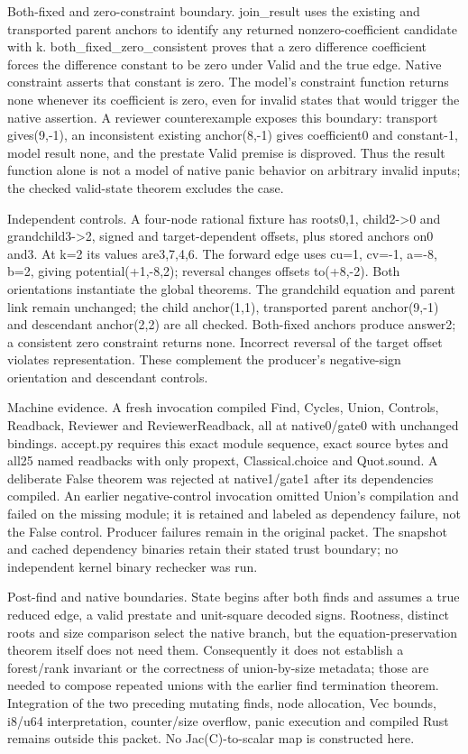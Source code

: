 \documentclass[10pt]{article}
\begin{document}
Both-fixed and zero-constraint boundary. join\_result uses the existing and transported parent anchors to identify any returned nonzero-coefficient candidate with k. both\_fixed\_zero\_consistent proves that a zero difference coefficient forces the difference constant to be zero under Valid and the true edge. Native constraint asserts that constant is zero. The model's constraint function returns none whenever its coefficient is zero, even for invalid states that would trigger the native assertion. A reviewer counterexample exposes this boundary: transport gives(9,-1), an inconsistent existing anchor(8,-1) gives coefficient0 and constant-1, model result none, and the prestate Valid premise is disproved. Thus the result function alone is not a model of native panic behavior on arbitrary invalid inputs; the checked valid-state theorem excludes the case.\par\medskip
Independent controls. A four-node rational fixture has roots0,1, child2->0 and grandchild3->2, signed and target-dependent offsets, plus stored anchors on0 and3. At k=2 its values are3,7,4,6. The forward edge uses cu=1, cv=-1, a=-8, b=2, giving potential(+1,-8,2); reversal changes offsets to(+8,-2). Both orientations instantiate the global theorems. The grandchild equation and parent link remain unchanged; the child anchor(1,1), transported parent anchor(9,-1) and descendant anchor(2,2) are all checked. Both-fixed anchors produce answer2; a consistent zero constraint returns none. Incorrect reversal of the target offset violates representation. These complement the producer's negative-sign orientation and descendant controls.\par\medskip
Machine evidence. A fresh invocation compiled Find, Cycles, Union, Controls, Readback, Reviewer and ReviewerReadback, all at native0/gate0 with unchanged bindings. accept.py requires this exact module sequence, exact source bytes and all25 named readbacks with only propext, Classical.choice and Quot.sound. A deliberate False theorem was rejected at native1/gate1 after its dependencies compiled. An earlier negative-control invocation omitted Union's compilation and failed on the missing module; it is retained and labeled as dependency failure, not the False control. Producer failures remain in the original packet. The snapshot and cached dependency binaries retain their stated trust boundary; no independent kernel binary rechecker was run.\par\medskip
Post-find and native boundaries. State begins after both finds and assumes a true reduced edge, a valid prestate and unit-square decoded signs. Rootness, distinct roots and size comparison select the native branch, but the equation-preservation theorem itself does not need them. Consequently it does not establish a forest/rank invariant or the correctness of union-by-size metadata; those are needed to compose repeated unions with the earlier find termination theorem. Integration of the two preceding mutating finds, node allocation, Vec bounds, i8/u64 interpretation, counter/size overflow, panic execution and compiled Rust remains outside this packet. No Jac(C)-to-scalar map is constructed here.\par\medskip
\end{document}
